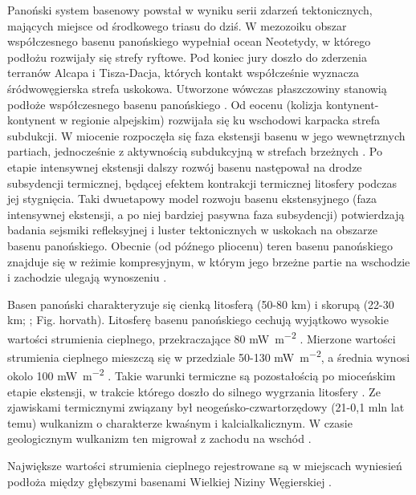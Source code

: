 \documentclass[11.5pt,twoside]{report}
\begin{document}
Panoński system basenowy powstał w wyniku serii zdarzeń tektonicznych, mających miejsce od środkowego triasu do dziś. W mezozoiku obszar współczesnego basenu panońskiego wypełniał ocean Neotetydy, w którego podłożu rozwijały się strefy ryftowe. Pod koniec jury doszło do zderzenia terranów Alcapa i Tisza-Dacja, których kontakt współcześnie wyznacza śródwowęgierska strefa uskokowa. Utworzone wówczas płaszczowiny stanowią podłoże współczesnego basenu panońskiego \parencite{Csontos.2004}. Od eocenu (kolizja kontynent-kontynent w regionie alpejskim) rozwijała się ku wschodowi karpacka strefa subdukcji. W miocenie rozpoczęła się faza ekstensji basenu w jego wewnętrznych partiach, jednocześnie z aktywnością subdukcyjną w strefach brzeżnych \parencite{Csontos.2004}. Po etapie intensywnej ekstensji dalszy rozwój basenu następował na drodze subsydencji termicznej, będącej efektem kontrakcji termicznej litosfery podczas jej stygnięcia. Taki dwuetapowy model rozwoju basenu ekstensyjnego (faza intensywnej ekstensji, a po niej bardziej pasywna faza subsydencji) potwierdzają badania sejsmiki refleksyjnej i luster tektonicznych w uskokach na obszarze basenu panońskiego. Obecnie (od pó\'{z}nego pliocenu) teren basenu panońskiego znajduje się w reżimie kompresyjnym, w którym jego brzeżne partie na wschodzie i zachodzie ulegają wynoszeniu \parencite{Horvath.1996}. 


Basen panoński charakteryzuje się cienką litosferą (50-80 km) i skorupą (22-30 km; \cite{Harangi.2007}; Fig. {horvath}). Litosferę basenu panońskiego cechują wyjątkowo wysokie wartości strumienia cieplnego, przekraczające 80 \si{\milli\watt\per\meter\squared} \parencite{Boldizsar.1964}. Mierzone wartości strumienia cieplnego mieszczą się w przedziale 50-130 \si{\milli\watt\per\meter\squared}, a średnia wynosi okolo 100 \si{\milli\watt\per\meter\squared} \parencite{Horvath.2015}. Takie warunki termiczne są pozostałością po mioceńskim etapie ekstensji, w trakcie którego doszło do silnego wygrzania litosfery \parencite{Lenkey.2017}. Ze zjawiskami termicznymi związany był neogeńsko-czwartorzędowy (21-0,1 mln lat temu) wulkanizm o charakterze kwaśnym i kalcialkalicznym. W czasie geologicznym wulkanizm ten migrował z zachodu na wschód \parencite{Lexa.2010}. 

Największe wartości strumienia cieplnego rejestrowane są w miejscach wyniesień podłoża między głębszymi basenami Wielkiej Niziny Węgierskiej \parencite{Bekesi.2017}. 
\end{document}
